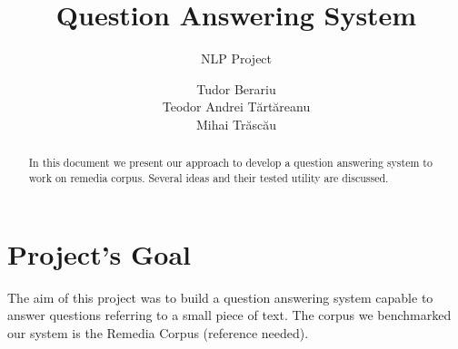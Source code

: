 \documentclass[lnbip]{svmultln}
\begin{document}
\mainmatter %

\title{Question Answering System} \subtitle{NLP Project}


\author{Tudor Berariu\\Teodor Andrei T\u{a}rt\u{a}reanu\\Mihai
  Tr\u{a}sc\u{a}u\\}  %
\maketitle %

\begin{abstract}        %
  In this document we present our approach to develop a question
  answering system to work on remedia corpus. Several ideas and their
  tested utility are discussed.

\end{abstract}

\section{Project's Goal}
\label{sec:intro}

The aim of this project was to build a question answering system
capable to answer questions referring to a small piece of text. The corpus we benchmarked our system is the Remedia Corpus (reference needed).




 
\end{document}
